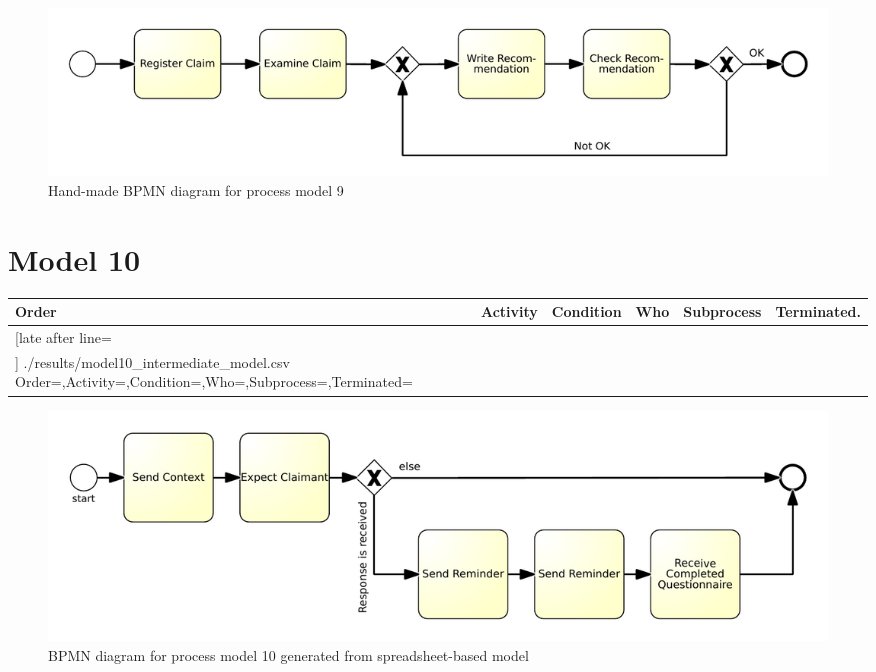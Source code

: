 \begin{figure}[H]
	\centering
	\includegraphics[width=\hsize]{./bpmn/model9.pdf}
	\caption{Hand-made BPMN diagram for process model 9}
	\label{bpmn:model9}
\end{figure}

\section{Model 10}
\begin{tcolorbox}[
	breakable,
	arc=0mm,
	left=1pt,
	right = 1pt,
	boxrule=0mm,
	colback = {white},
	]
	\texttt{}
\end{tcolorbox}
\label{txt:model10}

{\scriptsize
	\begin{longtable}{|p{0.03 \hsize}|p{0.25 \hsize}|p{0.15 \hsize}|p{0.2 \hsize}|p{0.1 \hsize}|p{0.1 \hsize}|}
		\hline
		Order & Activity & Condition & Who & Subprocess & Terminated.
		\\\hline\hline
		\csvreader[late after line=\\\hline]
		{./results/model10_intermediate_model.csv}
		{Order=\Order,Activity=\Activity,Condition=\Condition,Who=\Who,Subprocess=\Subprocess,Terminated=\Terminated}
		{\Order & \Activity & \Condition & \Who & \Subprocess & \Terminated}
		\caption{Spreadsheet-based description for process model 10}
		\label{csv:model10}
	\end{longtable}
}

\begin{figure}[H]
	\centering
	\includegraphics[width=\hsize]{./generated_bpmn/model10.pdf}
	\caption{BPMN diagram for process model 10 generated from spreadsheet-based model}
	\label{bpmn:generated_model10}
\end{figure}

